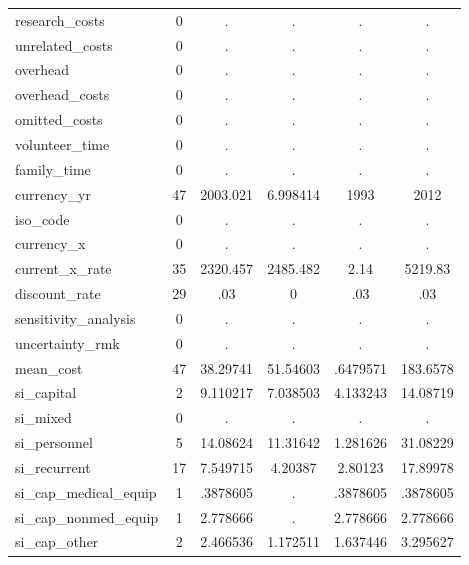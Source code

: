 \begin{table}[htbp]
\begin{tabular}{l*{1}{ccccc}}
research\_costs&           0&           .&           .&           .&           .\\
unrelated\_costs&           0&           .&           .&           .&           .\\
overhead    &           0&           .&           .&           .&           .\\
overhead\_costs&           0&           .&           .&           .&           .\\
omitted\_costs&           0&           .&           .&           .&           .\\
volunteer\_time&           0&           .&           .&           .&           .\\
family\_time &           0&           .&           .&           .&           .\\
currency\_yr &          47&    2003.021&    6.998414&        1993&        2012\\
iso\_code    &           0&           .&           .&           .&           .\\
currency\_x  &           0&           .&           .&           .&           .\\
current\_x\_rate&          35&    2320.457&    2485.482&        2.14&     5219.83\\
discount\_rate&          29&         .03&           0&         .03&         .03\\
sensitivity\_analysis&           0&           .&           .&           .&           .\\
uncertainty\_rmk&           0&           .&           .&           .&           .\\
mean\_cost   &          47&    38.29741&    51.54603&    .6479571&    183.6578\\
si\_capital  &           2&    9.110217&    7.038503&    4.133243&    14.08719\\
si\_mixed    &           0&           .&           .&           .&           .\\
si\_personnel&           5&    14.08624&    11.31642&    1.281626&    31.08229\\
si\_recurrent&          17&    7.549715&     4.20387&     2.80123&    17.89978\\
si\_cap\_medical\_equip&           1&    .3878605&           .&    .3878605&    .3878605\\
si\_cap\_nonmed\_equip&           1&    2.778666&           .&    2.778666&    2.778666\\
si\_cap\_other&           2&    2.466536&    1.172511&    1.637446&    3.295627\\

\end{tabular}
\end{table}
